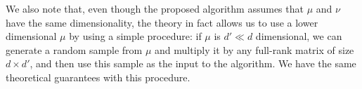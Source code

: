 We also note that, even though the proposed algorithm assumes that $\mu$ and $\nu$ have the same dimensionality, the theory in fact allows us to use a lower dimensional $\mu$ by using a simple procedure: if $\mu$ is $d' \ll d$ dimensional, we can generate a random sample from $\mu$ and multiply it by any full-rank matrix of size $d \times d'$, and then use this sample as the input to the algorithm. We have the same theoretical guarantees with this procedure. 
%
%
%


